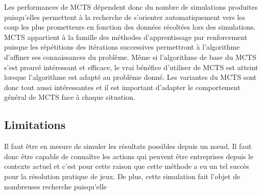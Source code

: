 Les performances de MCTS dépendent donc du nombre de simulations produites puisqu'elles permettent à la recherche de s'orienter automatiquement vers les coup les plus prometteurs en fonction des données récoltées lors des simulations. MCTS appartient à la famille des méthodes d'apprentissage par renforcement puisque les répétitions des itérations successives permettront à l'algorithme d'affiner ses connaissances du problème.
Même si l'algorithme de base du MCTS s'est prouvé intéressant et efficace, le vrai bénéfice d'utiliser de MCTS est atteint lorsque l'algorithme est adapté au problème donné. Les variantes du MCTS sont donc tout aussi intéressantes et il est important d'adapter le comportement général de MCTS face à chaque situation.


\subsection*{Limitations}
Il faut être en mesure de simuler les résultats possibles depuis un nœud. Il faut donc être capable de connaître les actions qui peuvent être entreprises depuis le contexte actuel et c'est pour cette raison que cette méthode a eu un tel succès pour la résolution pratique de jeux. De plus, cette simulation fait l'objet de nombreuses recherche puisqu'elle 




%
%

